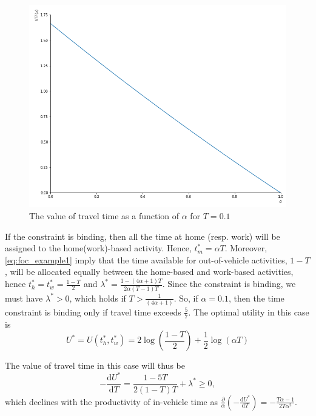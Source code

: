 \documentclass[12pt,a4paper,british]{article}
\begin{document}
\begin{casenv}
	\begin{figure}[ht!]%
	\centering
	\includegraphics[scale=0.6]{plotNumericalExample02.png}
	\caption{The value of travel time as a function of $\alpha$ for $T=0.1$}%
	\label{fig:example_det}%
	\end{figure}


	\item If the constraint is binding, then all the time at home (resp. work) will be assigned to the home(work)-based activity. Hence, $t_{m}^{\ast}=\alpha T$. Moreover, \eqref{eq:foc_example1} imply that the time available for out-of-vehicle activities, $1-T$, will be allocated equally between the home-based and work-based activities, hence $t_{h}^{\ast}=t_{w}^{\ast}=\frac{1-T}{2}$ and $\lambda^{\ast} = \frac{1-\left(4\alpha+1\right)T} {2 \alpha\left( T - 1 \right)T}$. Since the constraint is binding, we must have $\lambda^{\ast}>0$, which holds if $T > \frac{1}{\left(4\alpha+1\right)}$. So, if $\alpha = 0.1$, then the time constraint is binding only if travel time exceeds $ \frac{5}{7}$. The optimal utility in this case is
	\begin{equation*}
		U^{\ast} = U \left(t_h^{\ast}, t_w^{\ast}\right) = 2\log\left(\frac{1-T}{2}\right) +  \frac{1}{2}\log\left(\alpha T\right)
	\end{equation*}

	The value of travel time in this case will thus be 
	\begin{equation*}
		- \frac{\mathrm{d}U^{\ast}}{\mathrm{d}T} = \frac{1-5T}{2\left(1-T\right)T} + \lambda^{\ast} \geq 0 ,	
	\end{equation*}
	which declines with the productivity of in-vehicle time as $\frac{\partial}{\alpha} \left(-\frac{\mathrm{d} U^{\ast}}{\mathrm{d} T}\right) = - \frac{T \alpha - 1}{2 T \alpha^{2}}$.
	 
	
\end{casenv}
\end{document}
